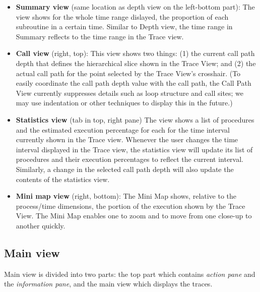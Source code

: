 \documentclass[english]{article}
\begin{document}
\begin{itemize}
\item \textbf{Summary view} (same location as depth view on the left-bottom part):
  The view shows for the whole time range dislayed, the proportion of each subroutine in a certain time.
  Similar to Depth view, the time range in Summary reflects to the time range in the Trace view. 

\item \textbf{Call view} (right, top):
  This view shows two things: (1) the current call path depth that defines the hierarchical slice shown in the Trace View; and (2) the actual call path for the point selected by the Trace View's crosshair.
  (To easily coordinate the call path depth value with the call path, the Call Path View currently suppresses details such as loop structure and call sites; we may use indentation or other techniques to display this in the future.)

\item \textbf{Statistics view} (tab in top, right pane)
  The view shows a list of procedures and the estimated execution percentage for each for the time interval currently shown in the Trace view. 
  Whenever the user changes the time interval displayed in the Trace view, the statistics view will update its list of procedures and their execution percentages to 
  reflect the current interval.  Similarly, a change in the selected call path depth will also update the contents of the statistics view.


\item \textbf{Mini map view} (right, bottom):
  The Mini Map shows, relative to the process/time dimensions, the portion of the execution shown by the Trace View.
  The Mini Map enables one to zoom and to move from one close-up to another quickly.

\end{itemize}



\subsection{Main view}

Main view is divided into two parts: the top part which contains \emph{action pane} and the \emph{information pane}, and the main view which displays the traces. 
\end{document}
